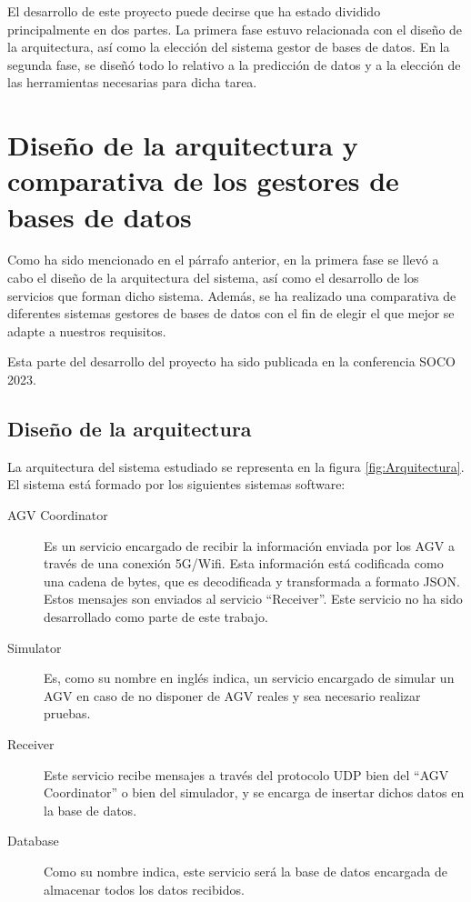 
El desarrollo de este proyecto puede decirse que ha estado dividido principalmente en dos partes. La primera
fase estuvo relacionada con el diseño de la arquitectura, así como la elección del sistema gestor de bases de
datos. En la segunda fase, se diseñó todo lo relativo a la predicción de datos y a la elección de las
herramientas necesarias para dicha tarea.

\section{Diseño de la arquitectura y comparativa de los gestores de bases de datos}

Como ha sido mencionado en el párrafo anterior, en la primera fase se llevó a cabo el diseño de la
arquitectura del sistema, así como el desarrollo de los servicios que forman dicho sistema. Además,
se ha realizado una comparativa de diferentes sistemas gestores de bases de datos con el fin de elegir
el que mejor se adapte a nuestros requisitos.

Esta parte del desarrollo del proyecto ha sido publicada en la conferencia SOCO 2023.

\subsection{Diseño de la arquitectura}

La arquitectura del sistema estudiado se representa en la figura \ref{fig:Arquitectura}. El sistema
está formado por los siguientes sistemas software:
\begin{description}
    \item [AGV Coordinator] Es un servicio encargado de recibir la información enviada por los AGV a
        través de una conexión 5G/Wifi. Esta información está codificada como una cadena de bytes, que
        es decodificada y transformada a formato JSON. Estos mensajes son enviados al servicio 
        ``Receiver''. Este servicio no ha sido desarrollado como parte de este trabajo.
    \item [Simulator] Es, como su nombre en inglés indica, un servicio encargado de simular un AGV
        en caso de no disponer de AGV reales y sea necesario realizar pruebas.
    \item [Receiver] Este servicio recibe mensajes a través del protocolo UDP bien del ``AGV Coordinator''
        o bien del simulador, y se encarga de insertar dichos datos en la base de datos.
    \item [Database] Como su nombre indica, este servicio será la base de datos encargada de almacenar
        todos los datos recibidos.
\end{description}

